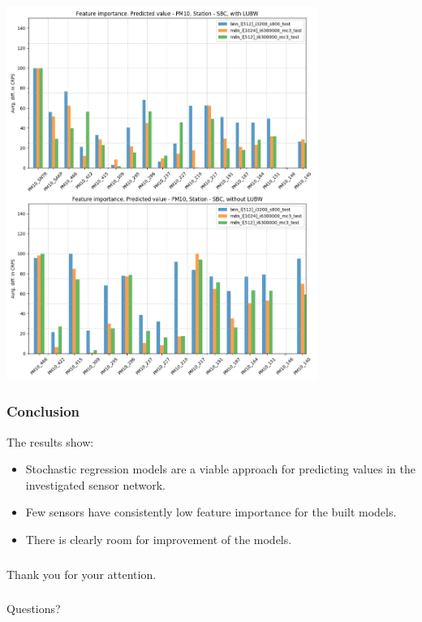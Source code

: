 \documentclass[18pt]{beamer}
\begin{document}
\begin{frame}
  \vspace*{-0.05in}
  \begin{center}
    \includegraphics[height=0.75\textwidth, width=0.76\textwidth]{images/feature_importance_CRPS_SBC_P1}
  \end{center}  
\end{frame}


\begin{frame}[t]
  \frametitle[Short]{Conclusion}
  The results show:
  \begin{itemize}
  \item Stochastic regression models are a viable approach for predicting values in the investigated sensor network.
  \item Few sensors have consistently low feature importance for the built models.
  \item There is clearly room for improvement of the models.
  \end{itemize}
  
\end{frame}


\begin{frame}
  \frametitle{}
  \begin{center}
    \huge{Thank you for your attention.}    
  \end{center}
\end{frame}

\begin{frame}
  \frametitle{}
  \begin{center}
    \huge{Questions?}    
  \end{center}
\end{frame}
\end{document}
